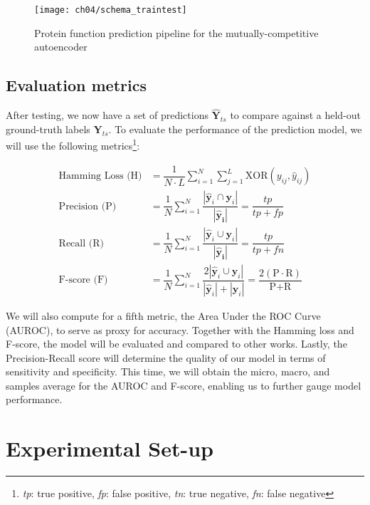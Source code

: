 \begin{figure}[!h]
  \centering
  \texttt{[image: ch04/schema\_traintest]}
  \caption[Protein function prediction pipeline]{Protein function prediction
  pipeline for the mutually-competitive autoencoder}
  \label{schema:traintest_mc}
\end{figure}

\subsection{Evaluation metrics}

After testing, we now have a set of predictions $\mathbf{\widehat{Y}}_{ts}$
to compare against a held-out ground-truth labels $\mathbf{Y}_{ts}$. To
evaluate the performance of the prediction model, we will use the following
metrics\footnote[2]{\textit{tp}: true positive, \textit{fp}: false positive,
\textit{tn}: true negative, \textit{fn}: false negative}:

\begin{align}
    \text{Hamming Loss (H)} &= \dfrac{1}{N \cdot L} \sum_{i=1}^{N} \sum_{j=1}^{L}
    \text{XOR}(y_{ij}, \widehat{y}_{ij}) \\
    \text{Precision (P)} &=
    \dfrac{1}{N}\sum_{i=1}^{N}\dfrac{|\mathbf{\widehat{y}}_{i} \cap
    \mathbf{y}_{i}|}{|\mathbf{\widehat{y}_{i}}|} = \dfrac{tp}{tp + fp} \\
    \text{Recall (R)} &=
    \dfrac{1}{N}\sum_{i=1}^{N}\dfrac{|\mathbf{\widehat{y}}_{i} \cup
    \mathbf{y}_{i}|}{|\mathbf{\widehat{y}_{i}}|} = \dfrac{tp}{tp + fn} \\
    \text{F-score (F)} &=
    \dfrac{1}{N}\sum_{i=1}^{N} \dfrac{2 | \mathbf{\widehat{y}}_{i} \cup
        \mathbf{y}_{i}|}{|\mathbf{\widehat{y}}_{i} | + |\mathbf{y}_{i}|} =
        \dfrac{2 (\text{P} \cdot \text{R})}{\text{P} +
        \text{R}}
\end{align}

\par We will also compute for a fifth metric, the Area Under the ROC Curve
(AUROC), to serve as proxy for accuracy. Together with the Hamming loss and
F-score, the model will be evaluated and compared to other works. Lastly, the
Precision-Recall score will determine the quality of our model in terms of
sensitivity and specificity. This time, we will obtain the micro, macro, and
samples average for the AUROC and F-score, enabling us to further gauge model
performance.

\section{Experimental Set-up}
\label{MCExperiments}

